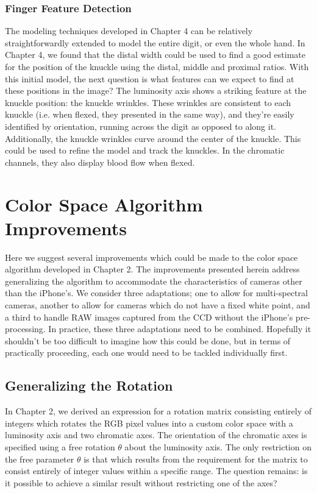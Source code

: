 \subsubsection{Finger Feature Detection}\label{sec:FingerFeatureDetection}
The modeling techniques developed in Chapter 4 can be relatively straightforwardly extended to model the entire digit, or even the whole hand. In Chapter 4, we found that the distal width could be used to find a good estimate for the position of the knuckle using the distal, middle and proximal ratios. With this initial model, the next question is what features can we expect to find at these positions in the image? The luminosity axis shows a striking feature at the knuckle position: the knuckle wrinkles. These wrinkles are consistent to each knuckle (i.e. when flexed, they presented in the same way), and they're easily identified by orientation, running across the digit as opposed to along it. Additionally, the knuckle wrinkles curve around the center of the knuckle. This could be used to refine the model and track the knuckles. In the chromatic channels, they also display blood flow when flexed.

\section{Color Space Algorithm Improvements}\label{sec:ColorSpaceAlgorithmImprovements}
Here we suggest several improvements which could be made to the color space algorithm developed in Chapter 2. The improvements presented herein address generalizing the algorithm to accommodate the characteristics of cameras other than the iPhone's. We consider three adaptations; one to allow for multi-spectral cameras, another to allow for cameras which do not have a fixed white point, and a third to handle RAW images captured from the CCD without the iPhone's pre-processing. In practice, these three adaptations need to be combined. Hopefully it shouldn't be too difficult to imagine how this could be done, but in terms of practically proceeding, each one would need to be tackled individually first.

\subsection{Generalizing the Rotation}\label{sec:GeneralizingTheRotation}
In Chapter 2, we derived an expression for a rotation matrix consisting entirely of integers which rotates the RGB pixel values into a custom color space with a luminosity axis and two chromatic axes. The orientation of the chromatic axes is specified using a free rotation $\theta$ about the luminosity axis. The only restriction on the free parameter $\theta$ is that which results from the requirement for the matrix to consist entirely of integer values within a specific range. The question remains: is it possible to achieve a similar result without restricting one of the axes?

